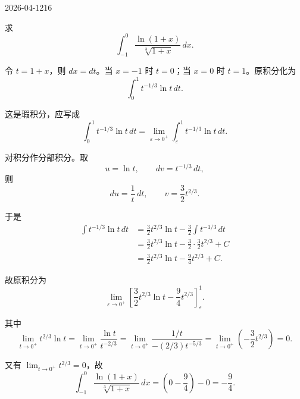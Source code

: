 \begin{mistake}{2026-04-12}{16}

\begin{problemcontent}
求
\[
\int_{-1}^{0} \frac{\ln(1+x)}{\sqrt[3]{1+x}}\,dx.
\]

\end{problemcontent}

\begin{solutioncontent}
令 \(t=1+x\)，则 \(dx=dt\)。当 \(x=-1\) 时 \(t=0\)；当 \(x=0\) 时 \(t=1\)。原积分化为
\[
\int_0^1 t^{-1/3}\ln t\,dt.
\]

这是瑕积分，应写成
\[
\int_0^1 t^{-1/3}\ln t\,dt
=\lim_{\varepsilon\to 0^+}\int_{\varepsilon}^1 t^{-1/3}\ln t\,dt.
\]

对积分作分部积分。取
\[
u=\ln t,
\qquad dv=t^{-1/3}\,dt,
\]
则
\[
du=\frac{1}{t}\,dt,
\qquad v=\frac{3}{2}t^{2/3}.
\]

于是
\[
\begin{aligned}
\int t^{-1/3}\ln t\,dt
&=\frac{3}{2}t^{2/3}\ln t-\frac{3}{2}\int t^{-1/3}\,dt\\
&=\frac{3}{2}t^{2/3}\ln t-\frac{3}{2}\cdot\frac{3}{2}t^{2/3}+C\\
&=\frac{3}{2}t^{2/3}\ln t-\frac{9}{4}t^{2/3}+C.
\end{aligned}
\]

故原积分为
\[
\lim_{\varepsilon\to 0^+}\left[\frac{3}{2}t^{2/3}\ln t-\frac{9}{4}t^{2/3}\right]_{\varepsilon}^{1}.
\]

其中
\[
\lim_{t\to 0^+} t^{2/3}\ln t
=\lim_{t\to 0^+}\frac{\ln t}{t^{-2/3}}
=\lim_{t\to 0^+}\frac{1/t}{-(2/3)t^{-5/3}}
=\lim_{t\to 0^+}\left(-\frac{3}{2}t^{2/3}\right)=0.
\]

又有 \(\lim_{t\to 0^+} t^{2/3}=0\)，故
\[
\int_{-1}^{0} \frac{\ln(1+x)}{\sqrt[3]{1+x}}\,dx
=\left(0-\frac{9}{4}\right)-0
=-\frac{9}{4}.
\]

\end{solutioncontent}


\end{mistake}
